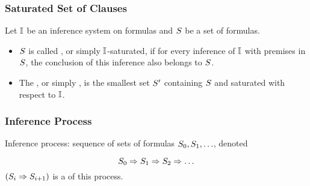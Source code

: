 
	   \begin{frame}\frametitle{Saturated Set of Clauses}

  Let ${\mathbb{I}}$ be an inference system on formulas and ${S}$ be a set of 
  formulas. 

\begin{itemize}
\item
${S}$ is called ,
  or simply \alert{${\mathbb{I}}$-saturated},
  if for every inference of ${\mathbb{I}}$ with premises in ${S}$, the conclusion
  of this inference also belongs to ${S}$.\\\bigskip

\item 
The ,
  or simply ,
  is the smallest set ${S'}$ containing ${S}$ and saturated with respect to
  ${\mathbb{I}}$.
\end{itemize}

\end{frame}


	   \begin{frame}\frametitle{Inference Process}

  \alert{Inference process:} sequence
  of sets of formulas ${S_0,S_1,\ldots}$, denoted 

    \[
      {S_0 \Rightarrow S_1 \Rightarrow S_2 \Rightarrow \ldots}
    \]
  ${(S_i \Rightarrow S_{i+1})}$ is a  of this 
  process. 

  \bigskip
  

\medskip


                           \end{frame}

